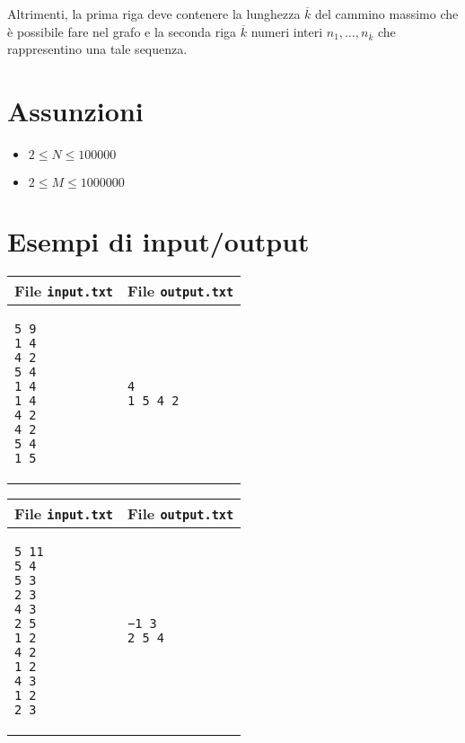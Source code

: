 \documentclass[a4paper,11pt]{article}
\begin{document}
      Altrimenti, la prima riga deve contenere
      la lunghezza $\overline{k}$ del cammino massimo che è possibile fare nel grafo e
      la seconda riga $\overline{k}$ numeri interi $n_{1}, \ldots, n_{\overline{k}}$
      che rappresentino una tale sequenza.

  \section*{Assunzioni}
  \begin{itemize}

    \item $2 ≤ N ≤  100000$
    \item $2 ≤ M ≤ 1000000$
  \end{itemize}

\section*{Esempi di input/output}


    \noindent
    \begin{tabular}{p{11cm}|p{5cm}}
    \toprule
    \textbf{File \texttt{input.txt}}
    & \textbf{File \texttt{output.txt}}
    \\
    \midrule
    \scriptsize
    \begin{verbatim}
5 9
1 4
4 2
5 4
1 4
1 4
4 2
4 2
5 4
1 5
      \end{verbatim}
    &
    \scriptsize
    \begin{verbatim}
4
1 5 4 2
      \end{verbatim}
    \\
    \bottomrule
    \end{tabular}

    \noindent
    \begin{tabular}{p{11cm}|p{5cm}}
    \toprule
    \textbf{File \texttt{input.txt}}
    & \textbf{File \texttt{output.txt}}
    \\
    \midrule
    \scriptsize
    \begin{verbatim}
5 11
5 4
5 3
2 3
4 3
2 5
1 2
4 2
1 2
4 3
1 2
2 3
      \end{verbatim}
    &
    \scriptsize
    \begin{verbatim}
−1 3
2 5 4
      \end{verbatim}
    \\
    \bottomrule
    \end{tabular}
\end{document}
